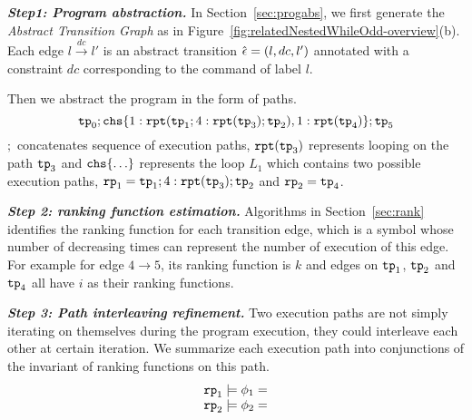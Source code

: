 
\textbf{\emph{Step1: Program abstraction.}}
In Section~\ref{sec:progabs},
we first 
generate the \emph{Abstract Transition Graph} as in Figure~\ref{fig:relatedNestedWhileOdd-overview}(b).
Each edge $l \xrightarrow{dc} l'$ is an abstract transition $\hat{\mathtt{\epsilon}{}} = (l, dc, l')$ annotated with a constraint $dc$ corresponding to the command of label $l$.

Then we abstract the program in the form of paths.
$$
\tpath_0 ; \rpchoose{ 1: \rprepeat(\tpath_1; 4:\rprepeat(\tpath_3); \tpath_2), 1:\rprepeat(\tpath_4) }; \tpath_5
$$
$;$ concatenates sequence of execution paths,
$\mathtt{rpt}(\mathtt{tp}_3)$ represents looping on the path $\mathtt{tp}_3$ and
$\rpchoose{ \ldots}$ represents the loop $L_1$ which contains two possible execution paths,
$\mathtt{rp}_1 = \mathtt{tp}_1; 4:\mathtt{rpt}(\mathtt{tp}_3);\mathtt{tp}_2$ and $\mathtt{rp}_2 =\mathtt{tp}_4$.

\textbf{\emph{Step 2: ranking function estimation.}}
Algorithms in Section~\ref{sec:rank} identifies the ranking function for each transition edge, which is a symbol whose number of decreasing times can represent the number of execution of this edge.
For example for edge $4 \to 5$, its ranking function is $k$ and edges on $\mathtt{tp}_1$, $\mathtt{tp}_2$ and $\mathtt{tp}_4$ all have $i$ as their ranking functions.


\textbf{\emph{Step 3: Path interleaving refinement.}} 
Two execution paths are not simply iterating on themselves during the program execution,
they could interleave each other at certain iteration.
We summarize each execution path into conjunctions of the invariant of ranking functions on this path.
\begin{equation}
    \begin{array}{l}
        \mathtt{rp}_1 \models \phi_1 = \\
    \mathtt{rp}_2 \models \phi_2 = 
    \end{array}
\end{equation}
  
